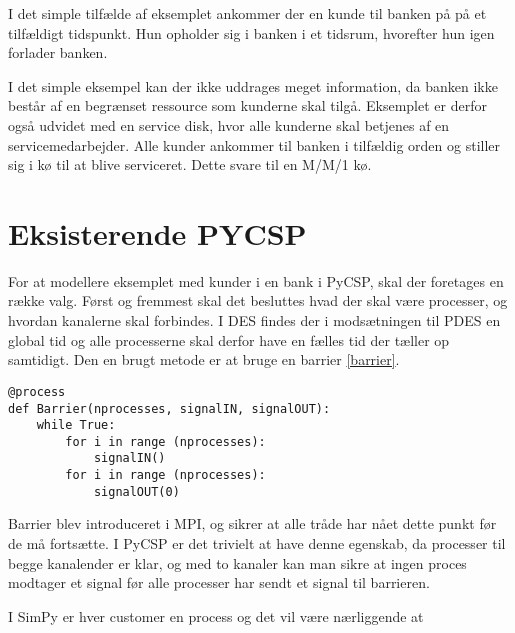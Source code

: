 I det simple tilfælde af eksemplet ankommer der en kunde til banken på på et 
tilfældigt tidspunkt. Hun opholder sig i banken i et tidsrum, hvorefter hun 
igen forlader banken.

I det simple eksempel kan der ikke uddrages meget information, da banken ikke 
består af en begrænset ressource som kunderne skal tilgå.  Eksemplet er derfor 
også udvidet med en service disk, hvor alle kunderne skal betjenes af en 
servicemedarbejder. Alle kunder ankommer til banken i tilfældig orden og 
stiller sig i kø til at blive serviceret. Dette  svare til en M/M/1 kø.


\section{Eksisterende PYCSP}
For at modellere eksemplet med kunder i en bank i PyCSP, skal der foretages en række valg. Først og fremmest skal det besluttes hvad der skal være processer, og hvordan  kanalerne skal forbindes. 
I DES findes der i modsætningen til PDES  en global tid og alle processerne skal derfor have  en fælles tid der tæller op samtidigt. Den en brugt metode er at  bruge en barrier \vref{barrier}.

\begin{lstlisting}[label=barrier,caption=A barrier in PyCSP]
@process
def Barrier(nprocesses, signalIN, signalOUT):
	while True:
		for i in range (nprocesses):
			signalIN()
		for i in range (nprocesses):
			signalOUT(0)
\end{lstlisting}

Barrier blev introduceret i MPI, og sikrer at alle tråde har nået dette punkt før de må fortsætte. 
I PyCSP er det trivielt at have  denne egenskab, da processer til begge kanalender er klar, og med to kanaler kan man sikre at ingen proces modtager et signal før alle processer har sendt et signal til barrieren.

I SimPy er hver customer en process og det vil være nærliggende at 


